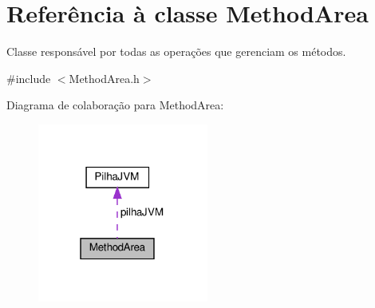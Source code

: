 \hypertarget{classMethodArea}{}\section{Referência à classe Method\+Area}
\label{classMethodArea}


Classe responsável por todas as operações que gerenciam os métodos.  




{\ttfamily \#include $<$Method\+Area.\+h$>$}



Diagrama de colaboração para Method\+Area\+:
\nopagebreak
\begin{figure}[H]
\begin{center}
\leavevmode
\includegraphics[width=159pt]{classMethodArea__coll__graph}
\end{center}
\end{figure}
